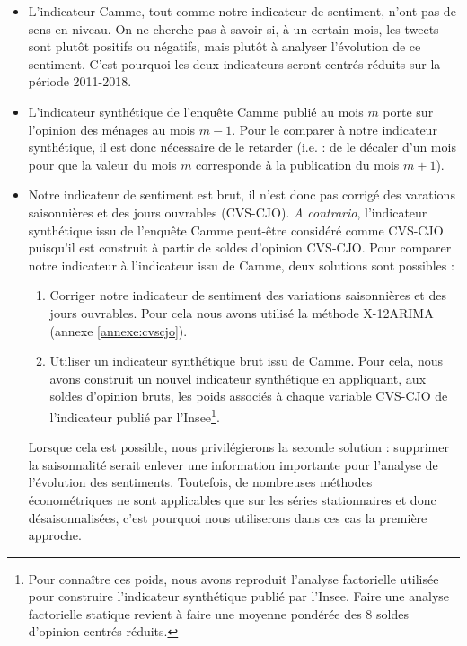 \documentclass[11pt,french,french]{article}
\let\rmarkdownfootnote\footnote%
\def\footnote{\protect\rmarkdownfootnote}
\begin{document}
\begin{itemize}
\item
  L'indicateur Camme, tout comme notre indicateur de sentiment, n'ont pas de sens en niveau. On ne cherche pas à savoir si, à un certain mois, les tweets sont plutôt positifs ou négatifs, mais plutôt à analyser l'évolution de ce sentiment.
  C'est pourquoi les deux indicateurs seront centrés réduits sur la période 2011-2018.
\item
  L'indicateur synthétique de l'enquête Camme publié au mois \(m\) porte sur l'opinion des ménages au mois \(m-1\).
  Pour le comparer à notre indicateur synthétique, il est donc nécessaire de le retarder (i.e. : de le décaler d'un mois pour que la valeur du mois \(m\) corresponde à la publication du mois \(m+1\)).
\item
  Notre indicateur de sentiment est brut, il n'est donc pas corrigé des varations saisonnières et des jours ouvrables (CVS-CJO).
  \emph{A contrario}, l'indicateur synthétique issu de l'enquête Camme peut-être considéré comme CVS-CJO puisqu'il est construit à partir de soldes d'opinion CVS-CJO.
  Pour comparer notre indicateur à l'indicateur issu de Camme, deux solutions sont possibles :

  \begin{enumerate}
  \def\labelenumi{\arabic{enumi}.}
  \item
    Corriger notre indicateur de sentiment des variations saisonnières et des jours ouvrables.
    Pour cela nous avons utilisé la méthode X-12ARIMA (annexe \ref{annexe:cvscjo}).
  \item
    Utiliser un indicateur synthétique brut issu de Camme.
    Pour cela, nous avons construit un nouvel indicateur synthétique en appliquant, aux soldes d'opinion bruts, les poids associés à chaque variable CVS-CJO de l'indicateur publié par l'Insee\footnote{Pour connaître ces poids, nous avons reproduit l'analyse factorielle utilisée pour construire l'indicateur synthétique publié par l'Insee. Faire une analyse factorielle statique revient à faire une moyenne pondérée des 8 soldes d'opinion centrés-réduits.}.
  \end{enumerate}

  Lorsque cela est possible, nous privilégierons la seconde solution : supprimer la saisonnalité serait enlever une information importante pour l'analyse de l'évolution des sentiments.
  Toutefois, de nombreuses méthodes économétriques ne sont applicables que sur les séries stationnaires et donc désaisonnalisées, c'est pourquoi nous utiliserons dans ces cas la première approche.
\end{itemize}
\end{document}
